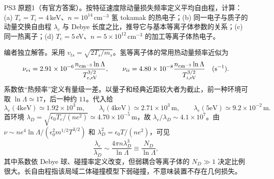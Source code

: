 \begin{exercise}\label{ex:hist02-3-1}
PS3 原题1（有官方答案）。按特征速度除动量损失频率定义平均自由程，计算：(a) $T_e=T_i=4\,$keV、$n=10^{14}\,\mathrm{cm^{-3}}$ 氢 tokamak 的热电子；(b) 同一电子与质子的动量交换自由程 $\lambda_c$ 与 Debye 长度之比，推导它与基本等离子体参数的关系；(c) 同一热离子；(d) $T_e=5\,$eV、$n=5\times10^{12}\,\mathrm{cm^{-3}}$ 的加工等离子体热电子。
\end{exercise}
\begin{solution}
编者独立解答。采用 $v_{ts}=\sqrt{2T_s/m_s}$。氢等离子体的常用热动量频率近似为
\begin{equation}\nu_{ei}=2.91\times10^{-6}\frac{n_{\rm cm^{-3}}\ln\Lambda}{T_{e,\rm eV}^{3/2}},\qquad \nu_{ii}=4.80\times10^{-8}\frac{n_{\rm cm^{-3}}\ln\Lambda}{T_{i,\rm eV}^{3/2}}\quad(\mathrm{s^{-1}}).\end{equation}
系数依“热频率”定义有量级一差。以量子和经典近距较大者为截止，前一种环境可取 $\ln\Lambda\simeq17$，后一种约 $11$。代入给
\begin{equation}\lambda_e(4\mathrm{keV})\simeq1.92\times10^3\,\mathrm m,\qquad
\lambda_i(4\mathrm{keV})\simeq2.71\times10^3\,\mathrm m,\qquad
\lambda_e(5\mathrm{eV})\simeq9.2\times10^{-2}\,\mathrm m.
\end{equation}
首环境 $\lambda_D=\sqrt{\epsilon_0T_e/(ne^2)}\simeq4.70\times10^{-5}\,$m，故 $\lambda_e/\lambda_D\sim4.1\times10^7$。由 $\nu\sim ne^4\ln\Lambda/(\epsilon_0^2m^{1/2}T^{3/2})$ 和 $\lambda_D^2=\epsilon_0T/(ne^2)$，可见
\begin{equation}\frac{\lambda_c}{\lambda_D}\sim\frac{4\pi n\lambda_D^3}{\ln\Lambda}\equiv\frac{N_D}{\ln\Lambda},\end{equation}
其中系数依 Debye 球、碰撞率定义改变，但弱耦合等离子体的 $N_D\gg1$ 决定比例很大。长自由程指该局域二体碰撞模型下弱碰撞，不意味装置不存在几何损失。
\end{solution}

